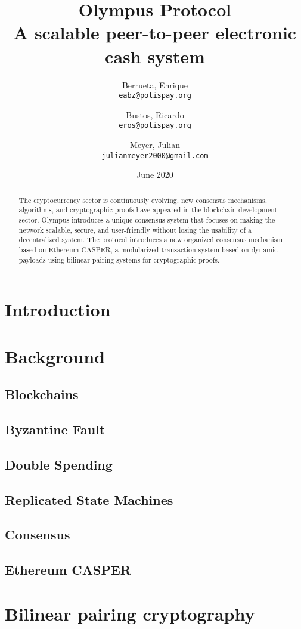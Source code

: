 \documentclass{article}
\title{%
  Olympus Protocol \\
  \large A scalable peer-to-peer electronic cash system}
\author{
  Berrueta, Enrique\\
  \texttt{eabz@polispay.org}
  \and
  Bustos, Ricardo\\
  \texttt{eros@polispay.org}
  \and
  Meyer, Julian\\
  \texttt{julianmeyer2000@gmail.com}
}
\date{June 2020}
\begin{document}
	\maketitle
	\begin{abstract}
		The cryptocurrency sector is continuously evolving, new consensus mechanisms, algorithms, and cryptographic proofs have appeared in the blockchain development sector. Olympus introduces a unique consensus system that focuses on making the network scalable, secure, and user-friendly without losing the usability of a decentralized system. The protocol introduces a new organized consensus mechanism based on Ethereum CASPER, a modularized transaction system based on dynamic payloads using bilinear pairing systems for cryptographic proofs.
	\end{abstract}
	
	\newpage
	
    \tableofcontents		
	
	\newpage
	
	\section{Introduction}
	\section{Background}
		\subsection{Blockchains}
		\subsection{Byzantine Fault}
		\subsection{Double Spending}
		\subsection{Replicated State Machines}
		\subsection{Consensus}
		\subsection{Ethereum CASPER}
		
	\section{Bilinear pairing cryptography}
\end{document}
